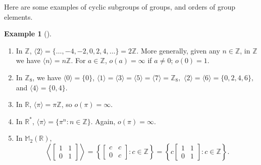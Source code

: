 \documentclass[10pt,]{book}
\theoremstyle{plain}
\theoremstyle{definition}
\theoremstyle{definition}
\theoremstyle{definition}
\newtheorem{example}[theorem]{Example}
\theoremstyle{definition}
\numberwithin{equation}{section}
\def\Z{\mathbb{Z}}
\def\R{\mathbb{R}}
\def\M{\mathbb{M}}
\newcommand{\amp}{ & }
\begin{document}
    Here are some examples of cyclic subgroups of groups, and orders of group elements.
\begin{example}[]\label{csexs}
\leavevmode%
\begin{enumerate}
\item\hypertarget{li-247}{}
            In \(\Z\), \(\langle 2\rangle =\{\ldots,-4,-2,0,2,4,\ldots\}=2\Z\). More generally, given any \(n\in \Z\), in \(\Z\) we have \(\langle n\rangle =n\Z\). For \(a\in \Z\), \(o(a)=\infty\) if \(a\neq 0\); \(o(0)=1\).
\item\hypertarget{li-248}{}
            In \(\Z_8\), we have \(\langle 0\rangle =\{0\}\), \(\langle 1\rangle =\langle 3\rangle =\langle 5\rangle =\langle 7\rangle =\Z_8,\) \(\langle 2\rangle =\langle 6\rangle =\{0,2,4,6\},\) and \(\langle 4\rangle =\{0,4\}\).
\item\hypertarget{li-249}{}
            In \(\R\), \(\langle \pi\rangle =\pi\Z\), so \(o(\pi)=\infty\).
\item\hypertarget{li-250}{}
            In \(\R^*\), \(\langle \pi\rangle =\{\pi^n:n\in \Z\}\). Again, \(o(\pi)=\infty\).
\item\hypertarget{li-251}{}
            In \(\M_2(\R)\),
\begin{equation*}

              \left\langle 
              \begin{bmatrix}
              1 \amp  1 \\
              0 \amp  1
              \end{bmatrix}\right\rangle =\left\{
              \begin{bmatrix}
              c \amp  c \\
              0 \amp  c
              \end{bmatrix} 
              : c\in \Z \right\}= \left\{c
              \begin{bmatrix}
              1 \amp  1 \\
              0 \amp  1
              \end{bmatrix} 
             : c\in \Z \right\}.
            
\end{equation*}


\end{enumerate}
\end{example}
\end{document}
